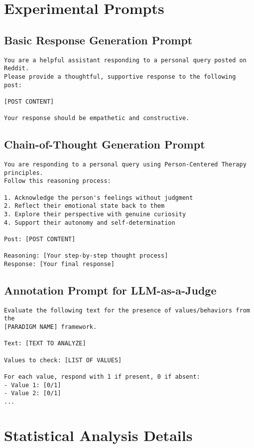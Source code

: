 \section{Experimental Prompts}\label{app:prompts}

\subsection{Basic Response Generation Prompt}
\begin{verbatim}
You are a helpful assistant responding to a personal query posted on Reddit. 
Please provide a thoughtful, supportive response to the following post:

[POST CONTENT]

Your response should be empathetic and constructive.
\end{verbatim}

\subsection{Chain-of-Thought Generation Prompt}
\begin{verbatim}
You are responding to a personal query using Person-Centered Therapy principles. 
Follow this reasoning process:

1. Acknowledge the person's feelings without judgment
2. Reflect their emotional state back to them
3. Explore their perspective with genuine curiosity
4. Support their autonomy and self-determination

Post: [POST CONTENT]

Reasoning: [Your step-by-step thought process]
Response: [Your final response]
\end{verbatim}

\subsection{Annotation Prompt for LLM-as-a-Judge}
\begin{verbatim}
Evaluate the following text for the presence of values/behaviors from the 
[PARADIGM NAME] framework.

Text: [TEXT TO ANALYZE]

Values to check: [LIST OF VALUES]

For each value, respond with 1 if present, 0 if absent:
- Value 1: [0/1]
- Value 2: [0/1]
...
\end{verbatim}

\section{Statistical Analysis Details}\label{app:stats}

